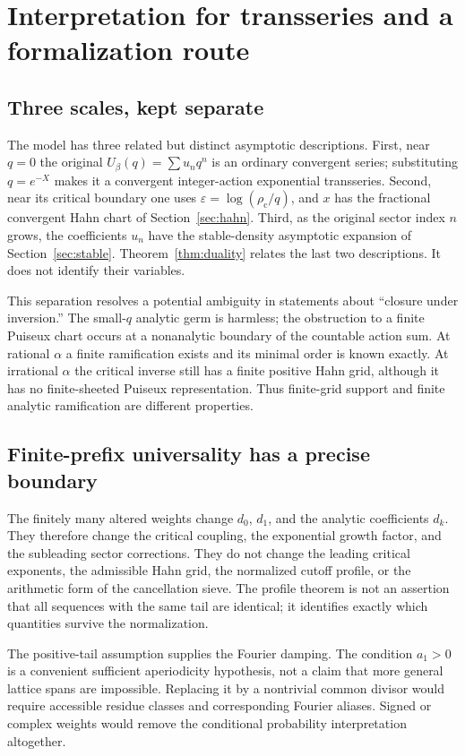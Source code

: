 \documentclass[11pt,a4paper]{article}
\numberwithin{equation}{section}
\theoremstyle{definition}
\theoremstyle{remark}
\newcommand{\rhoc}{\rho_{\mathrm c}}
\begin{document}
\section{Interpretation for transseries and a formalization route}
\label{sec:interpretation}

\subsection{Three scales, kept separate}
The model has three related but distinct asymptotic descriptions. First,
near $q=0$ the original $U_\beta(q)=\sum u_nq^n$ is an ordinary convergent
series; substituting $q=e^{-X}$ makes it a convergent integer-action
exponential transseries. Second, near its critical boundary one uses
$\varepsilon=\log(\rhoc/q)$, and $x$ has the fractional convergent Hahn
chart of Section~\ref{sec:hahn}. Third, as the original sector index
$n$ grows, the coefficients $u_n$ have the stable-density asymptotic
expansion of Section~\ref{sec:stable}. Theorem~\ref{thm:duality} relates
the last two descriptions. It does not identify their variables.

This separation resolves a potential ambiguity in statements about
``closure under inversion.'' The small-$q$ analytic germ is harmless;
the obstruction to a finite Puiseux chart occurs at a nonanalytic
boundary of the countable action sum. At rational $\alpha$ a finite
ramification exists and its minimal order is known exactly. At
irrational $\alpha$ the critical inverse still has a finite positive
Hahn grid, although it has no finite-sheeted Puiseux representation.
Thus finite-grid support and finite analytic ramification are different
properties.

\subsection{Finite-prefix universality has a precise boundary}
The finitely many altered weights change $d_0$, $d_1$, and the analytic
coefficients $d_k$. They therefore change the critical coupling, the
exponential growth factor, and the subleading sector corrections. They
do not change the leading critical exponents, the admissible Hahn grid,
the normalized cutoff profile, or the
arithmetic form of the cancellation sieve. The profile theorem is not
an assertion that all sequences with the same tail are identical;
it identifies exactly which quantities survive the normalization.

The positive-tail assumption supplies the Fourier damping. The condition
$a_1>0$ is a convenient sufficient aperiodicity hypothesis, not a claim
that more general lattice spans are impossible. Replacing it by a
nontrivial common divisor would require accessible residue classes and
corresponding Fourier aliases. Signed or complex weights would remove
the conditional probability interpretation altogether.
\end{document}
